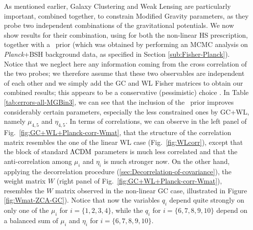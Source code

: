 As mentioned earlier, Galaxy Clustering and Weak Lensing are particularly important, combined together, to constrain Modified Gravity parameters, as they probe two independent combinations of the gravitational potentials. We now show results for their combination, using for both the non-linear HS prescription, together with a \planck\ prior
 (which was obtained by performing an MCMC analysis on {\it Planck}+BSH background data, as specified in Section \ref{sub:Fisher-Planck}). Notice that we neglect here any
 information coming from the cross correlation of the two probes; we therefore assume that these two observables are independent of each other
and we simply add the GC and WL Fisher matrices to obtain our combined results; this appears to be a conservative (pessimistic) choice 
\cite{Lacasa2016}.
 In Table \ref{tab:errors-all-MGBin3}, we can see that the inclusion of the \planck\ prior improves considerably certain parameters, especially
 the less constrained ones by GC+WL, namely $\mu_{4,5}$ and $\eta_{4,5}$.
 In terms of correlations, we can observe in the left panel of Fig.\ \ref{fig:GC+WL+Planck-corr-Wmat}, that the structure of the correlation matrix resembles the one of the linear WL case (Fig.\ \ref{fig:WLcorr}), except that the block of standard $\Lambda\mathrm{CDM}$ parameters is much less correlated and that the anti-correlation among $\mu_i$ and $\eta_i$ is much stronger now.
On the other hand, applying the decorrelation procedure (\cref{sec:Decorrelation-of-covariance}), the weight matrix $W$ (right panel of Fig.\ \ref{fig:GC+WL+Planck-corr-Wmat}), resembles the $W$ matrix observed in the non-linear GC case, illustrated in Figure \ref{fig:Wmat-ZCA-GC}). Notice that now the variables $q_i$ depend quite strongly on only one of the $\mu_i$ for $i=\{1,2,3,4\}$, while the $q_i$ for $i=\{6,7,8,9,10\}$ depend on a balanced sum of $\mu_i$ and $\eta_i$ for $i=\{6,7,8,9,10\}$.

